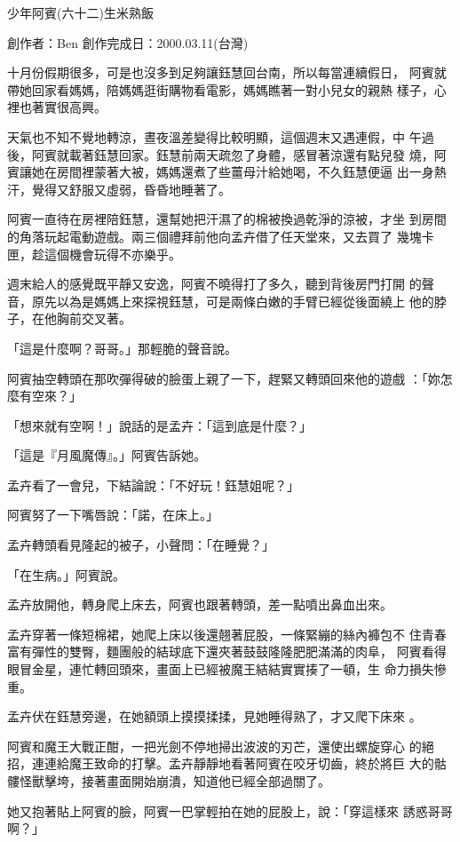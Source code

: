 



少年阿賓(六十二)生米熟飯

創作者：Ben
創作完成日：2000.03.11(台灣)



十月份假期很多，可是也沒多到足夠讓鈺慧回台南，所以每當連續假日，
阿賓就帶她回家看媽媽，陪媽媽逛街購物看電影，媽媽瞧著一對小兒女的親熱
樣子，心裡也著實很高興。

天氣也不知不覺地轉涼，晝夜溫差變得比較明顯，這個週末又遇連假，中
午過後，阿賓就載著鈺慧回家。鈺慧前兩天疏忽了身體，感冒著涼還有點兒發
燒，阿賓讓她在房間裡蒙著大被，媽媽還煮了些薑母汁給她喝，不久鈺慧便逼
出一身熱汗，覺得又舒服又虛弱，昏昏地睡著了。

阿賓一直待在房裡陪鈺慧，還幫她把汗濕了的棉被換過乾淨的涼被，才坐
到房間的角落玩起電動遊戲。兩三個禮拜前他向孟卉借了任天堂來，又去買了
幾塊卡匣，趁這個機會玩得不亦樂乎。

週末給人的感覺既平靜又安逸，阿賓不曉得打了多久，聽到背後房門打開
的聲音，原先以為是媽媽上來探視鈺慧，可是兩條白嫩的手臂已經從後面繞上
他的脖子，在他胸前交叉著。

「這是什麼啊？哥哥。」那輕脆的聲音說。

阿賓抽空轉頭在那吹彈得破的臉蛋上親了一下，趕緊又轉頭回來他的遊戲
：「妳怎麼有空來？」

「想來就有空啊！」說話的是孟卉：「這到底是什麼？」

「這是『月風魔傳』。」阿賓告訴她。

孟卉看了一會兒，下結論說：「不好玩！鈺慧姐呢？」

阿賓努了一下嘴唇說：「諾，在床上。」

孟卉轉頭看見隆起的被子，小聲問：「在睡覺？」

「在生病。」阿賓說。

孟卉放開他，轉身爬上床去，阿賓也跟著轉頭，差一點噴出鼻血出來。

孟卉穿著一條短棉裙，她爬上床以後還翹著屁股，一條緊繃的絲內褲包不
住青春富有彈性的雙臀，麵團般的結球底下還夾著鼓鼓隆隆肥肥滿滿的肉阜，
阿賓看得眼冒金星，連忙轉回頭來，畫面上已經被魔王結結實實揍了一頓，生
命力損失慘重。

孟卉伏在鈺慧旁邊，在她額頭上摸摸揉揉，見她睡得熟了，才又爬下床來
。

阿賓和魔王大戰正酣，一把光劍不停地掃出波波的刃芒，還使出螺旋穿心
的絕招，連連給魔王致命的打擊。孟卉靜靜地看著阿賓在咬牙切齒，終於將巨
大的骷髏怪獸擊垮，接著畫面開始崩潰，知道他已經全部過關了。

她又抱著貼上阿賓的臉，阿賓一巴掌輕拍在她的屁股上，說：「穿這樣來
誘惑哥哥啊？」

